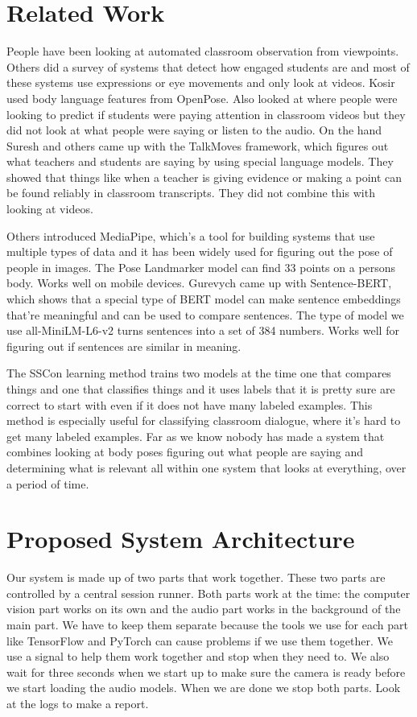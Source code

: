 \documentclass[conference]{IEEEtran}
\begin{document}
\section{Related Work}
People have been looking at automated classroom observation from viewpoints. Others \cite{b7} did a survey of systems that detect how engaged students are and most of these systems use expressions or eye movements and only look at videos. Kosir \cite{b8} used body language features from OpenPose. Also looked at where people were looking to predict if students were paying attention in classroom videos but they did not look at what people were saying or listen to the audio. On the hand Suresh and others \cite{b4} came up with the TalkMoves framework, which figures out what teachers and students are saying by using special language models. They showed that things like when a teacher is giving evidence or making a point can be found reliably in classroom transcripts. They did not combine this with looking at videos.

Others \cite{b2} introduced MediaPipe, which's a tool for building systems that use multiple types of data and it has been widely used for figuring out the pose of people in images. The Pose Landmarker model can find 33 points on a persons body. Works well on mobile devices. Gurevych \cite{b3} came up with Sentence-BERT, which shows that a special type of BERT model can make sentence embeddings that're meaningful and can be used to compare sentences. The type of model we use all-MiniLM-L6-v2 turns sentences into a set of 384 numbers. Works well for figuring out if sentences are similar in meaning.

The SSCon learning method \cite{b4} trains two models at the time one that compares things and one that classifies things and it uses labels that it is pretty sure are correct to start with even if it does not have many labeled examples. This method is especially useful for classifying classroom dialogue, where it's hard to get many labeled examples. Far as we know nobody has made a system that combines looking at body poses figuring out what people are saying and determining what is relevant all within one system that looks at everything, over a period of time.

\section{Proposed System Architecture}
Our system is made up of two parts that work together. These two parts are controlled by a central session runner. Both parts work at the time: the computer vision part works on its own and the audio part works in the background of the main part. We have to keep them separate because the tools we use for each part like TensorFlow and PyTorch can cause problems if we use them together. We use a signal to help them work together and stop when they need to. We also wait for three seconds when we start up to make sure the camera is ready before we start loading the audio models. When we are done we stop both parts. Look at the logs to make a report.
\end{document}
